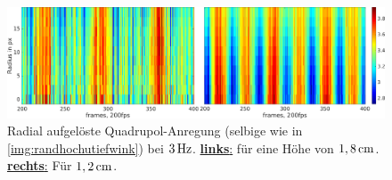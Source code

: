 \documentclass[numbers=noenddot,a4paper]{scrartcl}
\newcommand{\fett}[1]{\textbf{#1}}
\begin{document}
				\begin{figure}[!b]
					\centering
					\includegraphics[width=\textwidth,height=0.35\textwidth]{figs/auswertung/randhochutiefquad3Hz1sekrad.png}
					\caption{Radial aufgelöste Quadrupol-Anregung (selbige wie in \ref{img:randhochutiefwink}) bei $\unit[3]{Hz}$. \underline{\fett{links}:} für eine Höhe von $\unit[1,8]{cm}$. \underline{\fett{rechts}:} Für $\unit[1,2]{cm}$.}
					\label{img:randhochutiefrad}
				\end{figure}
\end{document}
